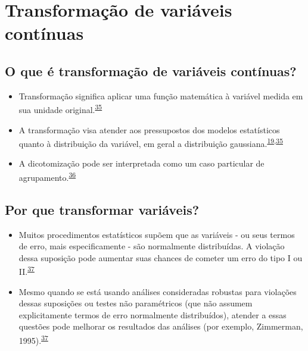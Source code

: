 \documentclass[
]{book}
\begin{document}
\hypertarget{transformacao}{%
\section{Transformação de variáveis contínuas}\label{transformacao}}

\hypertarget{o-que-uxe9-transformauxe7uxe3o-de-variuxe1veis-contuxednuas}{%
\subsection{O que é transformação de variáveis contínuas?}\label{o-que-uxe9-transformauxe7uxe3o-de-variuxe1veis-contuxednuas}}

\begin{itemize}
\item
  Transformação significa aplicar uma função matemática à variável medida em sua unidade original.\textsuperscript{\protect\hyperlink{ref-Bland1996}{35}}
\item
  A transformação visa atender aos pressupostos dos modelos estatísticos quanto à distribuição da variável, em geral a distribuição gaussiana.\textsuperscript{\protect\hyperlink{ref-vetter2017}{19},\protect\hyperlink{ref-Bland1996}{35}}
\item
  A dicotomização pode ser interpretada como um caso particular de agrupamento.\textsuperscript{\protect\hyperlink{ref-Fedorov2009}{36}}
\end{itemize}

\hypertarget{por-que-transformar-variuxe1veis}{%
\subsection{Por que transformar variáveis?}\label{por-que-transformar-variuxe1veis}}

\begin{itemize}
\item
  Muitos procedimentos estatísticos supõem que as variáveis - ou seus termos de erro, mais especificamente - são normalmente distribuídas. A violação dessa suposição pode aumentar suas chances de cometer um erro do tipo I ou II.\textsuperscript{\protect\hyperlink{ref-osborne2010}{37}}
\item
  Mesmo quando se está usando análises consideradas robustas para violações dessas suposições ou testes não paramétricos (que não assumem explicitamente termos de erro normalmente distribuídos), atender a essas questões pode melhorar os resultados das análises (por exemplo, Zimmerman, 1995).\textsuperscript{\protect\hyperlink{ref-osborne2010}{37}}
\end{itemize}
\end{document}
